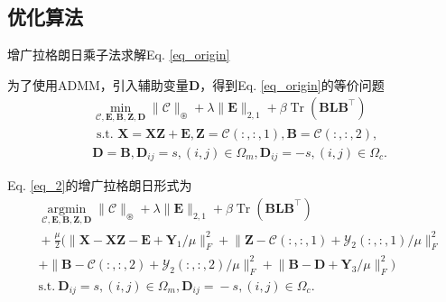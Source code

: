 \documentclass{beamer}
\begin{document}


\subsection{优化算法}

\begin{frame}{增广拉格朗日乘子法求解Eq. \eqref{eq_origin}}

    为了使用ADMM，引入辅助变量$\mathbf{D}$，得到Eq. \eqref{eq_origin}的等价问题
	\begin{equation}
		\begin{aligned}
			&\min_{\mathcal{C}, \mathbf{E}, \mathbf{B}, \mathbf{Z}, \mathbf{D} }\|\mathcal{C}\|_{\circledast}+\lambda\|\mathbf{E}\|_{2,1}+\beta\operatorname{Tr}(\mathbf{B L B}^{\top}) \\
			&\text { s.t. } \mathbf{X}=\mathbf{X Z}+\mathbf{E}, \mathbf{Z}=\mathcal{C}(:,:,1), \mathbf{B}=\mathcal{C}(:,:,2),\\
			&\mathbf{D}=\mathbf{B}, \mathbf{D}_{i j}=s,(i, j) \in \Omega_{m}, \mathbf{D}_{i j}=-s,(i, j) \in \Omega_{c}. 
		\end{aligned}
		\label{eq_2}
	\end{equation}

    Eq. \eqref{eq_2}的增广拉格朗日形式为
	\begin{equation}
		\begin{aligned}
			&\underset{\mathcal{C}, \mathbf{E}, \mathbf{B}, \mathbf{Z}, \mathbf{D}}{\operatorname{argmin}}\|\mathcal{C}\|_{\circledast}\!+\!\lambda\|\mathbf{E}\|_{2,1}\!+\!\beta\operatorname{Tr}(\mathbf{B L B}^{\top}) \\
			&\!+\!\frac{\mu}{2}\!(\|\mathbf{X}\!-\!\mathbf{X\!Z}\!-\!\mathbf{E}\!+\!\mathbf{Y}_{1}\!/ \mu\|_{F}^{2}\!+\!\|\mathbf{Z}\!-\!\mathcal{C}\!(:\!,\!:\!,\!1\!)\!+\!\mathcal{Y}_{2}\!(:\!,\!:\!,\!1\!)\!/\! \mu\|_{F}^{2}\\
			&+\|\mathbf{B}\!-\!\mathcal{C}(:,:,2)\!+\!\mathcal{Y}_{2}(:,:,2)\!/\! \mu\|_{F}^{2}\!+\!\|\mathbf{B}\!-\!\mathbf{D}\!+\!\mathbf{Y}_{3}\!/\!\mu\|_{F}^{2}) \\
			&\text {s.t.}~\mathbf{D}_{i j}\!=\!s,(i,j)\!\in\!\Omega_{m}, \mathbf{D}_{i j}\!=\!-\!s,(i,j)\!\in\!\Omega_{c}.
		\end{aligned}
		\label{eq_3}
	\end{equation}
\end{frame}
\end{document}
